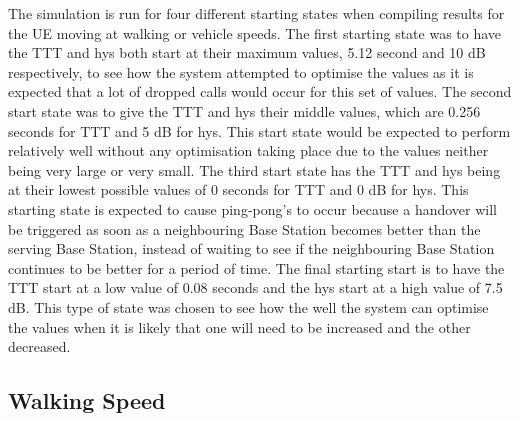 The simulation is run for four different starting states when compiling results for the UE moving at walking or vehicle speeds. The first starting state was to have the TTT and hys both start at their maximum values, 5.12 second and 10 dB respectively, to see how the system attempted to optimise the values as it is expected that a lot of dropped calls would occur for this set of values. The second start state was to give the TTT and hys their middle values, which are 0.256 seconds for TTT and 5 dB for hys. This start state would be expected to perform relatively well without any optimisation taking place due to the values neither being very large or very small. The third start state has the TTT and hys being at their lowest possible values of 0 seconds for TTT and 0 dB for hys. This starting state is expected to cause ping-pong's to occur because a handover will be triggered as soon as a neighbouring Base Station becomes better than the serving Base Station, instead of waiting to see if the neighbouring Base Station continues to be better for a period of time. The final starting start is to have the TTT start at a low value of 0.08 seconds and the hys start at a high value of 7.5 dB. This type of state was chosen to see how the well the system can optimise the values when it is likely that one will need to be increased and the other decreased.
\subsection{Walking Speed}
